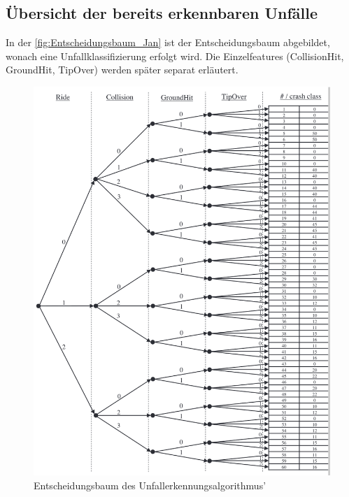 \subsection{Übersicht der bereits erkennbaren Unfälle}

%

In der \autoref{fig:Entscheidungsbaum_Jan} ist der Entscheidungsbaum abgebildet, wonach eine Unfallklassifizierung erfolgt wird. Die Einzelfeatures (CollisionHit, GroundHit, TipOver) werden später separat erläutert.
\begin{figure}
	\centering
	\includegraphics[width=\linewidth]{Bilder/Entscheidungsbaum_Jan.png} %
	\caption{Entscheidungsbaum des Unfallerkennungsalgorithmus'\citep{Schneeclassification2021}}
	\label{fig:Entscheidungsbaum_Jan}
\end{figure}

